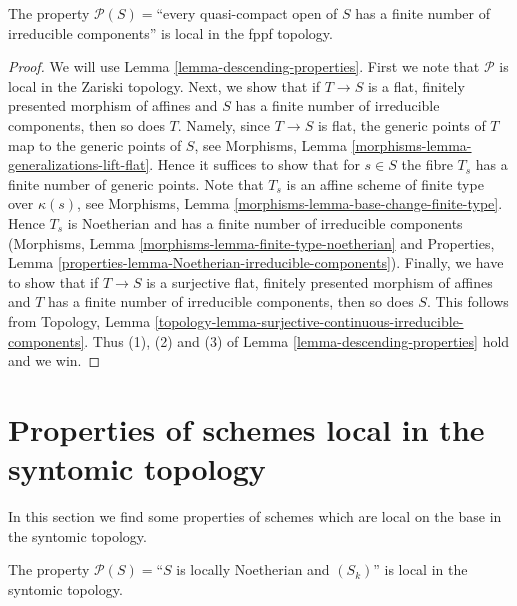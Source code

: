 \begin{lemma}
\label{lemma-locally-finite-nr-irred-local-fppf}
The property $\mathcal{P}(S) =$``every quasi-compact open of $S$
has a finite number of irreducible components'' is local
in the fppf topology.
\end{lemma}

\begin{proof}
We will use Lemma \ref{lemma-descending-properties}. First we note that
$\mathcal{P}$ is local in the Zariski topology.
Next, we show that if $T \to S$ is a flat, finitely presented
morphism of affines and $S$ has a finite number of irreducible
components, then so does $T$. Namely, since $T \to S$ is flat,
the generic points of $T$ map to the generic points of $S$, see
Morphisms, Lemma \ref{morphisms-lemma-generalizations-lift-flat}.
Hence it suffices to show that for $s \in S$ the fibre $T_s$
has a finite number of generic points. Note that $T_s$ is an
affine scheme of finite type over $\kappa(s)$, see
Morphisms, Lemma \ref{morphisms-lemma-base-change-finite-type}.
Hence $T_s$ is Noetherian and has a finite number of irreducible components
(Morphisms, Lemma \ref{morphisms-lemma-finite-type-noetherian} and
Properties, Lemma \ref{properties-lemma-Noetherian-irreducible-components}).
Finally, we have to show that if $T \to S$ is a surjective flat,
finitely presented morphism of affines and $T$ has a finite number of
irreducible components, then so does $S$. This follows from Topology, Lemma
\ref{topology-lemma-surjective-continuous-irreducible-components}.
Thus (1), (2) and (3) of Lemma \ref{lemma-descending-properties} hold
and we win.
\end{proof}




\section{Properties of schemes local in the syntomic topology}
\label{section-descending-properties-syntomic}

\noindent
In this section we find some properties of schemes which are local on the base
in the syntomic topology.

\begin{lemma}
\label{lemma-Sk-local-syntomic}
The property $\mathcal{P}(S) =$``$S$ is locally Noetherian and $(S_k)$''
is local in the syntomic topology.
\end{lemma}

